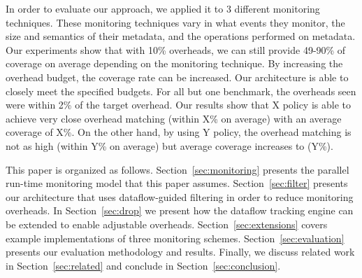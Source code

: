 
In order to evaluate our approach, we applied it to 3 different monitoring
techniques. These monitoring techniques vary in what events they monitor, the
size and semantics of their metadata, and the operations performed on metadata.
Our experiments show that with 10\% overheads, we can still provide 49-90\% of
coverage on average depending on the monitoring technique. By increasing the
overhead budget, the coverage rate can be increased. Our architecture is able
to closely meet the specified budgets. For all but one benchmark, the overheads
seen were within 2\% of the target overhead. Our results show that X policy is
able to achieve very close overhead matching (within X\% on average) with an
average coverage of X\%. On the other hand, by using Y policy, the overhead
matching is not as high (within Y\% on average) but average coverage increases
to (Y\%).

This paper is organized as follows. Section~\ref{sec:monitoring} presents the
parallel run-time monitoring model that this paper assumes.
Section~\ref{sec:filter} presents our architecture that uses dataflow-guided filtering
in order to reduce monitoring overheads. In Section~\ref{sec:drop} we present
how the dataflow tracking engine can be extended to enable adjustable overheads.
Section~\ref{sec:extensions} covers example implementations of three monitoring
schemes. Section~\ref{sec:evaluation} presents our evaluation methodology and
results. Finally, we discuss related work in Section~\ref{sec:related} and
conclude in Section~\ref{sec:conclusion}.

